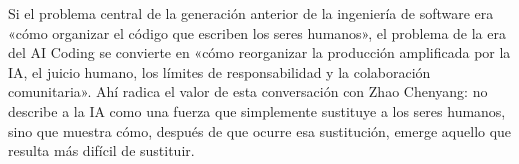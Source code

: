 Si el problema central de la generación anterior de la ingeniería de software era «cómo organizar el código que escriben los seres humanos», el problema de la era del AI Coding se convierte en «cómo reorganizar la producción amplificada por la IA, el juicio humano, los límites de responsabilidad y la colaboración comunitaria». Ahí radica el valor de esta conversación con Zhao Chenyang: no describe a la IA como una fuerza que simplemente sustituye a los seres humanos, sino que muestra cómo, después de que ocurre esa sustitución, emerge aquello que resulta más difícil de sustituir.
